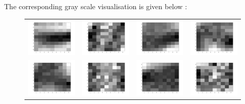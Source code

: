 \documentclass{article} %
\begin{document}
\newpage
The corresponding gray scale visualisation is given below :
\begin{figure}[H]
\centering
\begin{tabular}{cccc}
\includegraphics[width=0.2\linewidth]{images/Fig_grey_1.png}
&
\includegraphics[width=0.2\linewidth]{images/Fig_grey_2.png}
&
\includegraphics[width=0.2\linewidth]{images/Fig_grey_3.png}
&
\includegraphics[width=0.2\linewidth]{images/Fig_grey_4.png}
\\
\includegraphics[width=0.2\linewidth]{images/Fig_grey_5.png}
&
\includegraphics[width=0.2\linewidth]{images/Fig_grey_6.png}
&
\includegraphics[width=0.2\linewidth]{images/Fig_grey_7.png}
&
\includegraphics[width=0.2\linewidth]{images/Fig_grey_8.png}

\end{tabular}
\end{figure}
\end{document}

